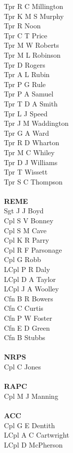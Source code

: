 \begin{multicols}{3}
  Tpr R C Millington \\
  Tpr K M S Murphy \\
  Tpr R Noon \\
  Tpr C T Price \\
  Tpr M W Roberts \\
  Tpr M L Robinson \\
  Tpr D Rogers \\
  Tpr A L Rubin \\
  Tpr P G Rule \\
  Tpr P A Samuel \\
  Tpr T D A Smith \\
  Tpr L J Speed \\
  Tpr J M Waddington \\
  Tpr G A Ward \\
  Tpr R D Wharton \\
  Tpr M C Whiley \\
  Tpr D J Williams \\
  Tpr T Wissett \\
  Tpr S C Thompson \\
  \\
  \textbf{REME} \\
  Sgt J J Boyd \\
  Cpl S V Bonney \\
  Cpl S M Cave \\
  Cpl K R Parry \\
  Cpl R F Parsonage \\
  Cpl G Robb \\
  LCpl P R Daly \\
  LCpl D A Taylor \\
  LCpl J A Woolley \\
  Cfn B R Bowers \\
  Cfn C Curtis \\
  Cfn P W Foster \\
  Cfn E D Green \\
  Cfn B Stubbs \\
  \\
  \textbf{NRPS} \\
  Cpl C Jones \\
  \\
  \textbf{RAPC} \\
  Cpl M J Manning \\
  \\
  \textbf{ACC} \\
  Cpl G E Dentith \\
  LCpl A C Cartwright \\
  LCpl D McPherson \\
\end{multicols}

